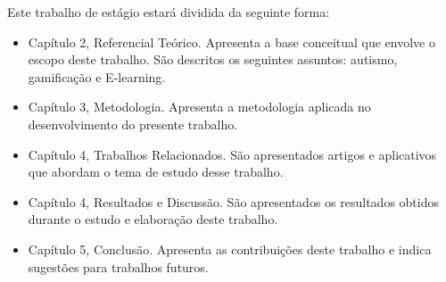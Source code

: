 Este trabalho de estágio estará dividida da seguinte forma:
 	\begin{itemize}
		\item Capítulo 2, Referencial Teórico. Apresenta a base conceitual que envolve o escopo deste trabalho. São descritos os seguintes assuntos: autismo, gamificação e E-learning.
		
		\item Capítulo 3, Metodologia. Apresenta a metodologia aplicada no desenvolvimento do presente trabalho.
		
		\item Capítulo 4, Trabalhos Relacionados. São apresentados artigos e aplicativos que abordam o tema de estudo desse trabalho.
		
		\item Capítulo 4, Resultados e Discussão. São apresentados os resultados obtidos durante o estudo e elaboração deste trabalho.
		
		\item Capítulo 5, Conclusão. Apresenta as contribuições deste trabalho e indica sugestões para trabalhos futuros.
	\end{itemize}

